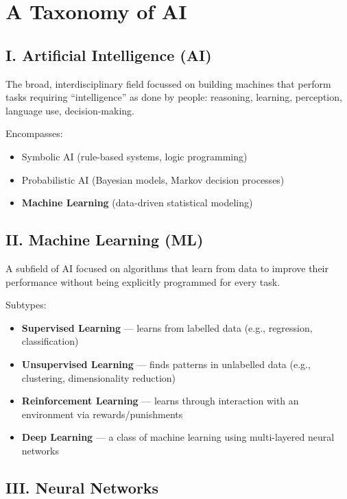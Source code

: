 \documentclass[
  10t,
]{article}
\providecommand{\tightlist}{%
  \setlength{\itemsep}{0pt}\setlength{\parskip}{0pt}}
\begin{document}
\section{A Taxonomy of AI}\label{a-taxonomy-of-ai}

\subsection{I. Artificial Intelligence
(AI)}\label{i.-artificial-intelligence-ai}

The broad, interdisciplinary field focussed on building machines that
perform tasks requiring ``intelligence'' as done by people: reasoning,
learning, perception, language use, decision-making.

Encompasses:

\begin{itemize}
\tightlist
\item
  Symbolic AI (rule-based systems, logic programming)
\item
  Probabilistic AI (Bayesian models, Markov decision processes)
\item
  \textbf{Machine Learning} (data-driven statistical modeling)
\end{itemize}

\subsection{II. Machine Learning (ML)}\label{ii.-machine-learning-ml}

A subfield of AI focused on algorithms that learn from data to improve
their performance without being explicitly programmed for every task.

Subtypes:

\begin{itemize}
\tightlist
\item
  \textbf{Supervised Learning} --- learns from labelled data (e.g.,
  regression, classification)
\item
  \textbf{Unsupervised Learning} --- finds patterns in unlabelled data
  (e.g., clustering, dimensionality reduction)
\item
  \textbf{Reinforcement Learning} --- learns through interaction with an
  environment via rewards/punishments
\item
  \textbf{Deep Learning} --- a class of machine learning using
  multi-layered neural networks
\end{itemize}

\subsection{III. Neural Networks}\label{iii.-neural-networks}
\end{document}
